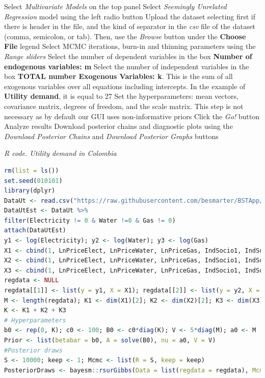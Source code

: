 \begin{algorithm}[h!]
	\caption{Seemingly unrelated regression}\label{alg:SUR}
	\begin{algorithmic}[1]  		 			
		\State Select \textit{Multivariate Models} on the top panel
		\State Select \textit{Seemingly Unrelated Regression} model using the left radio button
		\State Upload the dataset selecting first if there is header in the file, and the kind of separator in the \textit{csv} file of the dataset (comma, semicolon, or tab). Then, use the \textit{Browse} button under the \textbf{Choose File} legend
		\State Select MCMC iterations, burn-in and thinning parameters using the \textit{Range sliders}
		\State Select the number of dependent variables in the box \textbf{Number of endogenous variables: m}
		\State Select the number of independent variables in the box \textbf{TOTAL number Exogenous Variables: k}. This is the sum of all exogenous variables over all equations including intercepts. In the example of \textbf{Utility demand}, it is equal to 27
		\State Set the hyperparameters: mean vectors, covariance matrix, degrees of freedom, and the scale matrix. This step is not necessary as by default our GUI uses non-informative priors
		\State Click the \textit{Go!} button
		\State Analyze results
		\State Download posterior chains and diagnostic plots using the \textit{Download Posterior Chains} and \textit{Download Posterior Graphs} buttons
	\end{algorithmic} 
\end{algorithm}


\begin{tcolorbox}[enhanced,width=4.67in,center upper,
	fontupper=\large\bfseries,drop shadow southwest,sharp corners]
	\textit{R code. Utility demand in Colombia}
	\begin{VF}
		\begin{lstlisting}[language=R]
rm(list = ls())
set.seed(010101)
library(dplyr)
DataUt <- read.csv("https://raw.githubusercontent.com/besmarter/BSTApp/refs/heads/master/DataApp/Utilities.csv", sep = ",", header = TRUE, quote = "")
DataUtEst <- DataUt %>%  
filter(Electricity != 0 & Water !=0 & Gas != 0)
attach(DataUtEst)
y1 <- log(Electricity); y2 <- log(Water); y3 <- log(Gas)
X1 <- cbind(1, LnPriceElect, LnPriceWater, LnPriceGas, IndSocio1, IndSocio2, Altitude, Nrooms, HouseholdMem, Lnincome)
X2 <- cbind(1, LnPriceElect, LnPriceWater, LnPriceGas, IndSocio1, IndSocio2, Nrooms, HouseholdMem)
X3 <- cbind(1, LnPriceElect, LnPriceWater, LnPriceGas, IndSocio1, IndSocio2, Altitude, Nrooms, HouseholdMem)
regdata <- NULL
regdata[[1]] <- list(y = y1, X = X1); regdata[[2]] <- list(y = y2, X = X2); regdata[[3]] <- list(y = y3, X = X3)
M <- length(regdata); K1 <- dim(X1)[2]; K2 <- dim(X2)[2]; K3 <- dim(X3)[2] 
K <- K1 + K2 + K3
# Hyperparameters
b0 <- rep(0, K); c0 <- 100; B0 <- c0*diag(K); V <- 5*diag(M); a0 <- M
Prior <- list(betabar = b0, A = solve(B0), nu = a0, V = V)
#Posterior draws
S <- 10000; keep <- 1; Mcmc <- list(R = S, keep = keep)
PosteriorDraws <- bayesm::rsurGibbs(Data = list(regdata = regdata), Mcmc = Mcmc, Prior = Prior)
\end{lstlisting}
	\end{VF}
\end{tcolorbox}


